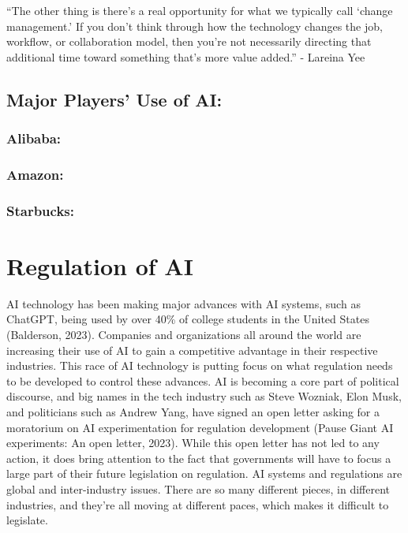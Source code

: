\documentclass[
]{book}
\begin{document}
``The other thing is there's a real opportunity for what we typically call `change
management.' If you don't think through how the technology changes the job, workflow,
or collaboration model, then you're not necessarily directing that additional time toward
something that's more value added.''
- Lareina Yee

\hypertarget{major-players-use-of-ai}{%
\section{Major Players' Use of AI:}\label{major-players-use-of-ai}}

\hypertarget{alibaba}{%
\subsection{Alibaba:}\label{alibaba}}

\hypertarget{amazon}{%
\subsection{Amazon:}\label{amazon}}

\hypertarget{starbucks}{%
\subsection{Starbucks:}\label{starbucks}}

\hypertarget{regulation-of-ai}{%
\chapter{Regulation of AI}\label{regulation-of-ai}}

AI technology has been making major advances with AI systems, such as ChatGPT, being used by over 40\% of college students in the United States (Balderson, 2023). Companies and organizations all around the world are increasing their use of AI to gain a competitive advantage in their respective industries. This race of AI technology is putting focus on what regulation needs to be developed to control these advances. AI is becoming a core part of political discourse, and big names in the tech industry such as Steve Wozniak, Elon Musk, and politicians such as Andrew Yang, have signed an open letter asking for a moratorium on AI experimentation for regulation development (Pause Giant AI experiments: An open letter, 2023). While this open letter has not led to any action, it does bring attention to the fact that governments will have to focus a large part of their future legislation on regulation. AI systems and regulations are global and inter-industry issues. There are so many different pieces, in different industries, and they're all moving at different paces, which makes it difficult to legislate.
\end{document}
